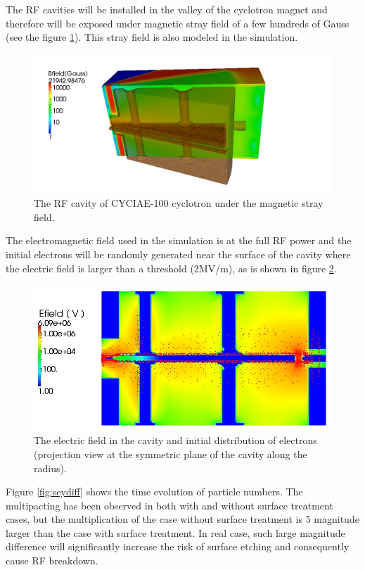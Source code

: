 \documentclass[aps,prstab,superscriptaddress,showpacs]{revtex4-1}
\begin{document}
The RF cavities will be installed in the valley of the cyclotron magnet and therefore will be exposed under magnetic stray field of a few hundreds of Gauss (see the figure \ref{fig:valley}). This stray field is also modeled in the simulation.


\begin{figure}[H]
   \centering
  \includegraphics*[width=0.7\linewidth,angle=0]{figures/Bfield_Cavity.jpg}
   \caption{The RF cavity of CYCIAE-100 cyclotron under the magnetic stray field.}
   \label{fig:valley}
\end{figure}
 The electromagnetic field used in the simulation is at the full RF power and the initial electrons will be randomly generated near the surface of the cavity where the electric field is larger than a threshold (2MV/m), as is shown in figure \ref{fig:initial}. 
\begin{figure}[H]
   \centering
  \includegraphics*[width=0.5\linewidth,angle=0]{figures/initial_field_particle.jpg}
   \caption{The electric field in the cavity and initial distribution of electrons (projection view at the symmetric plane of the cavity along the radius).}
   \label{fig:initial}
\end{figure}

Figure \ref{fig:seydiff} shows the time evolution of particle numbers. The multipacting has been observed in both with and without surface treatment cases, but the multiplication of the case without surface treatment is 5 magnitude larger than the case with surface treatment. In real case, such large magnitude difference will significantly increase the risk of surface etching and consequently cause RF breakdown. 
\end{document}
